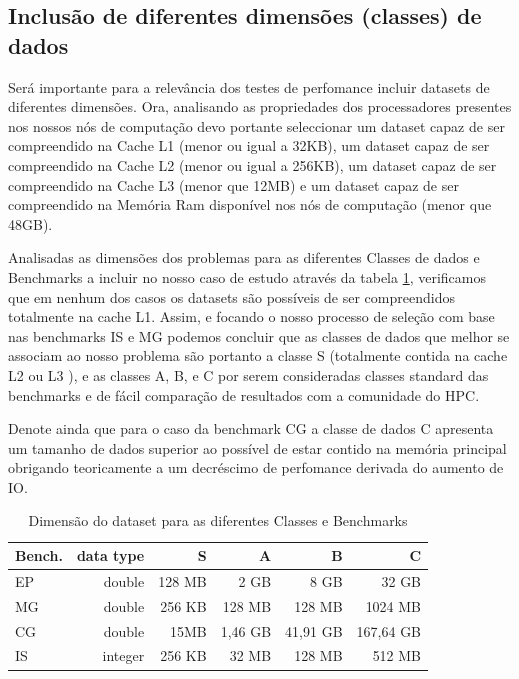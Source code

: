 \documentclass[conference,compsoc]{IEEEtran}
\begin{document}
\subsection{Inclusão de diferentes dimensões (classes) de dados}

Será importante para a relevância dos testes de perfomance incluir datasets de diferentes dimensões. Ora, analisando as propriedades dos processadores presentes nos nossos nós de computação devo portante seleccionar um dataset capaz de ser compreendido na Cache L1 (menor ou igual a 32KB), um dataset capaz de ser compreendido na Cache L2 (menor ou igual a 256KB), um dataset capaz de ser compreendido na Cache L3 (menor que 12MB) e um dataset capaz de ser compreendido na Memória Ram disponível nos nós de computação (menor que 48GB). \par 
Analisadas as dimensões dos problemas para as diferentes Classes de dados e Benchmarks a incluir no nosso caso de estudo através da tabela \ref{table:dimensaoproblema}, verificamos que em nenhum dos casos os datasets são possíveis de ser compreendidos totalmente na cache L1. Assim, e focando o nosso processo de seleção com base nas benchmarks IS e MG podemos concluir que as classes de dados que melhor se associam ao nosso problema são portanto a classe S (totalmente contida na cache L2 ou L3 ), e as classes A, B, e C por serem consideradas classes standard das benchmarks e de fácil comparação de resultados com a comunidade do HPC. \par 
Denote ainda que para o caso da benchmark CG a classe de dados C apresenta um tamanho de dados superior ao possível de estar contido na memória principal obrigando teoricamente a um decréscimo de perfomance derivada do aumento de IO.\par 

\begin{table}[h!]
\caption{Dimensão do dataset para as diferentes Classes e Benchmarks}
     \label{table:dimensaoproblema}
\centering
  \begin{tabular}{ | l | r |  r | r | r | r |  }
  
    \hline
    Bench. & data type & S & A & B & C \\ \hline 
    
     EP &  double & 128	MB & 2	GB	 & 8	GB	& 32	GB \\ \hline 
     
  MG &  double &   256	KB & 128	MB	& 128	MB	& 1024	MB \\ \hline 
    CG & double & 15MB & 1,46	GB& 41,91	GB	& 167,64	GB \\ \hline 
    IS & integer & 256	KB & 32	MB	& 128	MB	& 512	MB \\ \hline 

  \end{tabular}
\end{table}
\end{document}
